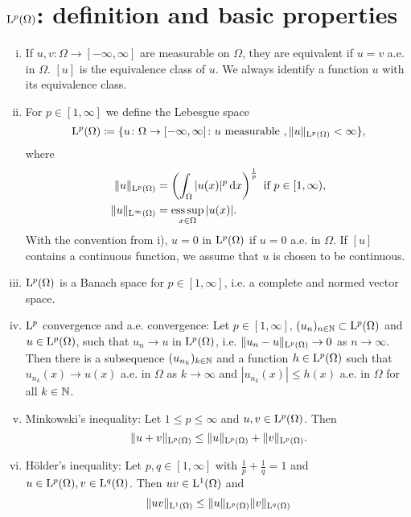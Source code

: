 \section{\texorpdfstring{$\mathrm{L}^p(\Omega)$}{L\textasciicircum p(Omega)}: definition and basic properties}
\label{sec:lpBasics}
\begin{enumerate}[i)]
  \item If $u,v \colon \Omega \to [-\infty,\infty]$ are measurable on $\Omega$, they are equivalent if $u = v$ a.e. in $\Omega$.
    $[u]$ is the equivalence class of $u$.
    We always identify a function $u$ with its equivalence class.
  \item For $p \in [1,\infty]$ we define the Lebesgue space
    $$
    \mathrm{L}^p(\Omega) \coloneqq \{ u \colon \Omega \to [-\infty,\infty] \colon u \text{ measurable }, \|u\|_{\mathrm{L}^p(\Omega)} < \infty \},
    $$
    where
    \begin{align*}
      \|u\|_{\Ell^p(\Omega)} &= \left( \int_\Omega |u(x)|^p \d x \right)^{\frac{1}{p}} \text{ if } p \in [1,\infty), \\
        \|u\|_{\Ell^\infty(\Omega)} &= \esssup_{x \in \Omega} |u(x)|.
    \end{align*}
    With the convention from i), $u = 0$ in $\mathrm{L}^p(\Omega)$ if $u = 0$ a.e. in $\Omega$.
    If $[u]$ contains a continuous function, we assume that $u$ is chosen to be continuous.
  \item $\mathrm{L}^p(\Omega)$ is a Banach space for $p \in [1,\infty]$, i.e. a complete and normed vector space.
  \item $\mathrm{L}^p$ convergence and a.e. convergence: Let $p \in [1,\infty]$, $(u_n)_{n \in \mathbb{N}} \subset \mathrm{L}^p(\Omega)$ and $u \in \mathrm{L}^p(\Omega)$, such that $u_n \to u$ in $\mathrm{L}^p(\Omega)$, i.e. $\|u_n - u\|_{\mathrm{L}^p(\Omega)} \to 0$ as $n \to \infty$.
    Then there is a subsequence $(u_{n_k})_{k \in \mathbb{N}}$ and a function $h \in \mathrm{L}^p(\Omega)$ such that $u_{n_k}(x) \to u(x)$ a.e. in $\Omega$ as $k \to \infty$ and $|u_{n_k}(x)| \leq h(x)$ a.e. in $\Omega$ for all $k \in \mathbb{N}$.
  \item Minkowski's inequality: Let $1 \leq p \leq \infty$ and $u,v \in \mathrm{L}^p(\Omega)$.
    Then
    $$
    \|u + v\|_{\mathrm{L}^p(\Omega)} \leq \|u\|_{\mathrm{L}^p(\Omega)}+ \|v\|_{\mathrm{L}^p(\Omega)}.
    $$
  \item Hölder's inequality: Let $p,q \in [1,\infty]$ with $\frac{1}{p} + \frac{1}{q} = 1$ and $u \in \mathrm{L}^p(\Omega), v \in \mathrm{L}^q(\Omega)$. 
    Then $uv \in \mathrm{L}^1(\Omega)$ and
    $$
    \|uv\|_{\mathrm{L}^1(\Omega)} \leq \|u\|_{\mathrm{L}^p(\Omega)} \|v\|_{\mathrm{L}^q(\Omega)}
$$
\end{enumerate}
